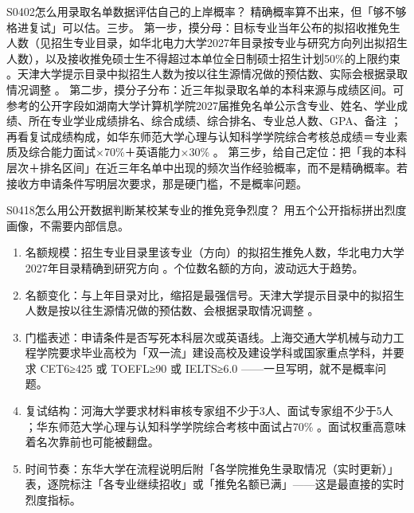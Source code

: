 \begin{qa}{S0402}{怎么用录取名单数据评估自己的上岸概率？}
精确概率算不出来，但「够不够格进复试」可以估。三步。
第一步，摸分母：目标专业当年公布的拟招收推免生人数（见招生专业目录，如华北电力大学2027年目录按专业与研究方向列出拟招生人数），以及接收推免硕士生不得超过本单位全日制硕士招生计划50\%的上限约束 。天津大学提示目录中拟招生人数为按以往生源情况做的预估数、实际会根据录取情况调整 。
第二步，摸分子分布：近三年拟录取名单的本科来源与成绩区间。可参考的公开字段如湖南大学计算机学院2027届推免名单公示含专业、姓名、学业成绩、所在专业学业成绩排名、综合成绩、综合排名、专业总人数、GPA、备注 ；再看复试成绩构成，如华东师范大学心理与认知科学学院综合考核总成绩＝专业素质及综合能力面试×70\%＋英语能力×30\% 。
第三步，给自己定位：把「我的本科层次＋排名区间」在近三年名单中出现的频次当作经验概率，而不是精确概率。若接收方申请条件写明层次要求，那是硬门槛，不是概率问题。
\end{qa}

\begin{qa}{S0418}{怎么用公开数据判断某校某专业的推免竞争烈度？}
用五个公开指标拼出烈度画像，不需要内部信息。
\begin{enumerate}
  \item 名额规模：招生专业目录里该专业（方向）的拟招生推免人数，华北电力大学2027年目录精确到研究方向 。个位数名额的方向，波动远大于趋势。
  \item 名额变化：与上年目录对比，缩招是最强信号。天津大学提示目录中的拟招生人数是按以往生源情况做的预估数、会根据录取情况调整 。
  \item 门槛表述：申请条件是否写死本科层次或英语线。上海交通大学机械与动力工程学院要求毕业高校为「双一流」建设高校及建设学科或国家重点学科，并要求 CET6≥425 或 TOEFL≥90 或 IELTS≥6.0 ——一旦写明，就不是概率问题。
  \item 复试结构：河海大学要求材料审核专家组不少于3人、面试专家组不少于5人 ；华东师范大学心理与认知科学学院综合考核中面试占70\% 。面试权重高意味着名次靠前也可能被翻盘。
  \item 时间节奏：东华大学在流程说明后附「各学院推免生录取情况（实时更新）」表，逐院标注「各专业继续招收」或「推免名额已满」——这是最直接的实时烈度指标。
\end{enumerate}
\end{qa}

